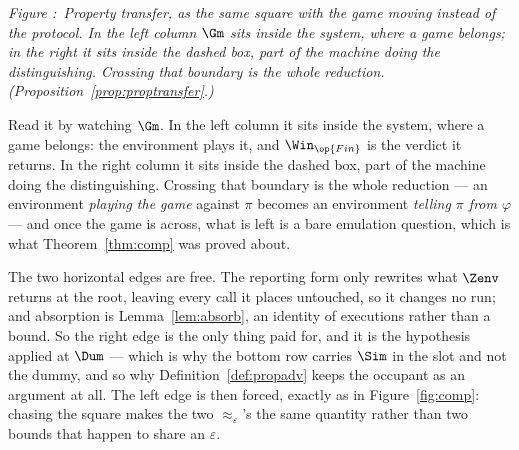 \documentclass[10pt,oneside,openany]{book}
\newcounter{diagram}
\newcommand{\figcaption}[2]{%
  \par\smallskip
  \refstepcounter{diagram}\label{#1}%
  \parbox{0.92\textwidth}{\footnotesize\itshape
    \textcolor{accent}{Figure \thediagram:}\ #2\par}}
\theoremstyle{accentdef}
\theoremstyle{accentplain}
\begin{document}
\begin{center}
\figcaption{fig:proptransfer}{Property transfer, as the same square with the game moving instead of the protocol. In the left column $\Gm$ sits inside the system, where a game belongs; in the right it sits inside the dashed box, part of the machine doing the distinguishing. Crossing that boundary is the whole reduction. (Proposition~\ref{prop:proptransfer}.)}
\end{center}

Read it by watching $\Gm$. In the left column it sits inside the system, where a game belongs: the
environment plays it, and $\Win_{\op{Fin}}$ is the verdict it returns. In the right column it sits
inside the dashed box, part of the machine doing the distinguishing. Crossing that boundary is the
whole reduction --- an environment \emph{playing the game} against $\pi$ becomes an environment
\emph{telling $\pi$ from $\varphi$} --- and once the game is across, what is left is a bare
emulation question, which is what Theorem~\ref{thm:comp} was proved about.

The two horizontal edges are free. The reporting form only rewrites what $\Zenv$ returns at the
root, leaving every call it places untouched, so it changes no run; and absorption is
Lemma~\ref{lem:absorb}, an identity of executions rather than a bound. So the right edge is the
only thing paid for, and it is the hypothesis applied at $\Dum$ --- which is why the bottom row
carries $\Sim$ in the slot and not the dummy, and so why Definition~\ref{def:propadv} keeps the
occupant as an argument at all. The left edge is then forced, exactly as in
Figure~\ref{fig:comp}: chasing the square makes the two $\approx_\varepsilon$'s the same quantity
rather than two bounds that happen to share an $\varepsilon$.
\end{document}
